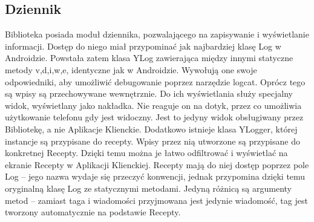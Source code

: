 \documentclass[11pt,a4paper,polish,thesis]{dcsbook}
\begin{document}
\subsection{Dziennik}
Biblioteka posiada moduł dziennika, pozwalającego na zapisywanie i wyświetlanie informacji. Dostęp do niego miał przypominać jak najbardziej klasę Log \cite{android.log} w Androidzie. Powstała zatem klasa YLog zawierająca między innymi statyczne metody v,d,i,w,e, identyczne jak w Androidzie. Wywołują one swoje odpowiedniki, aby umożliwić debugowanie poprzez narzędzie logcat. Oprócz tego są wpisy są przechowywane wewnętrznie.
Do ich wyświetlania służy specjalny widok, wyświetlany jako nakładka. Nie reaguje on na dotyk, przez co umożliwia użytkowanie telefonu gdy jest widoczny. Jest to jedyny widok obsługiwany przez Bibliotekę, a nie Aplikacje Klienckie.
Dodatkowo istnieje klasa YLogger, której instancje są przypisane do recepty. Wpisy przez nią utworzone są przypisane do konkretnej Recepty. Dzięki temu można je łatwo odfiltrować i wyświetlać na ekranie Recepty w Aplikacji Klienckiej. 
Recepty mają do niej dostęp poprzez pole Log -- jego nazwa wydaje się przeczyć konwencji, jednak przypomina dzięki temu oryginalną klasę Log ze statycznymi metodami. Jedyną różnicą są argumenty metod -- zamiast taga i wiadomości przyjmowana jest jedynie wiadomość, tag jest tworzony automatycznie na podstawie Recepty.
\end{document}

